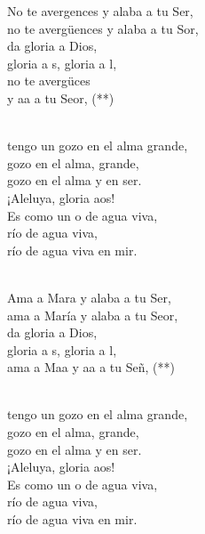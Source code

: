 \documentclass[12pt]{article}
\begin{document}
\begin{multicols*}{2}
\begin{cancion}
	No te avergences y alaba a tu Ser,\\
	no te avergüences y alaba a tu Sor, \\
da gloria a Dios,\\
	gloria a s, gloria a l,\\
	no te avergüces  \\
	y aa a tu Seor, (**)\\\jump\\
	\begin{chorus}%
	 tengo un gozo en el alma grande,\\
gozo en el alma, grande,\\
	gozo en el alma y en ser.\\
	¡Aleluya, gloria aos!\\
	Es como un o de agua viva, \\
río de agua viva,\\
	río de agua viva en mir. \\
	\end{chorus}%
	\jump\\
	Ama a Mara y alaba a tu Ser,\\
	ama a María y alaba a tu Seor,\\
da gloria a Dios,\\
	gloria a s, gloria a l,\\
	ama a Maa y aa a tu Señ, (**)  \\\jump\\
	\begin{chorus}%
	 tengo un gozo en el alma grande,\\
gozo en el alma, grande,\\
	gozo en el alma y en ser.\\
	¡Aleluya, gloria aos!\\
	Es como un o de agua viva, \\
río de agua viva,\\
	río de agua viva en mir. \\
	\end{chorus}%
	\jump\\
\end{cancion}%


\end{multicols*}
\end{document}
